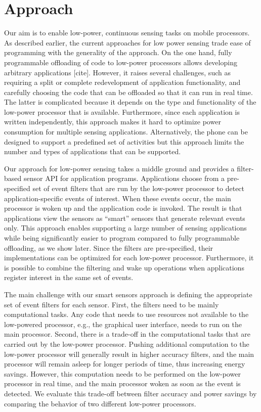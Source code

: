 \section{Approach}
\label{sec:approach}

Our aim is to enable low-power, continuous sensing tasks on mobile processors.
As described earlier, the current approaches for low power sensing trade ease of
programming with the generality of the approach. On the one hand, fully
programmable offloading of code to low-power processors allows developing
arbitrary applications [cite]. However, it raises several challenges, such as
requiring a split or complete redevelopment of application functionality, and
carefully choosing the code that can be offloaded so that it can run in real
time. The latter is complicated because it depends on the type and functionality
of the low-power processor that is available. Furthermore, since each
application is written independently, this approach makes it hard to optimize
power consumption for multiple sensing applications. Alternatively, the phone
can be designed to support a predefined set of activities but this approach
limits the number and types of applications that can be supported.

Our approach for low-power sensing takes a middle ground and provides a
filter-based sensor API for application programs. Applications choose from a
pre-specified set of event filters that are run by the low-power processor to
detect application-specific events of interest. When these events occur, the
main processor is woken up and the application code is invoked. The result is
that applications view the sensors as ``smart'' sensors that generate relevant
events only. This approach enables supporting a large number of sensing
applications while being significantly easier to program compared to fully
programmable offloading, as we show later. Since the filters are pre-specified,
their implementations can be optimized for each low-power
processor. Furthermore, it is possible to combine the filtering and wake up
operations when applications register interest in the same set of events.

The main challenge with our smart sensors approach is defining the appropriate
set of event filters for each sensor. First, the filters need to be mainly
computational tasks. Any code that needs to use resources not available to the
low-powered processor, e.g., the graphical user interface, needs to run on the
main processor. Second, there is a trade-off in the computational tasks that are
carried out by the low-power processor. Pushing additional computation to the
low-power processor will generally result in higher accuracy filters, and the
main processor will remain asleep for longer periods of time, thus increasing
energy savings. However, this computation needs to be performed on the low-power
processor in real time, and the main processor woken as soon as the event is
detected. We evaluate this trade-off between filter accuracy and power savings
by comparing the behavior of two different low-power processors.

